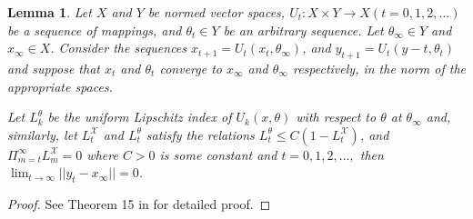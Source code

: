 \documentclass[jair, twoside,11pt,theapa]{article}
\newtheorem{lemm2}{Lemma}
\begin{document}
\begin{lemm2}
Let $X$ and $Y$ be normed vector spaces, $U_t: X \times Y \xrightarrow{} X (t=0,1,2, \ldots)$ be a sequence of mappings, and $\theta_t \in Y$ be an arbitrary sequence. Let $\theta_\infty \in Y$ and $x_\infty \in X$. Consider the sequences $x_{t+1} = U_t(x_t, \theta_\infty)$, and $y_{t+1} = U_t(y-t, \theta_t)$ and suppose that $x_t$ and $\theta_t$ converge to $x_\infty$ and $\theta_\infty$ respectively, in the norm of the appropriate spaces. 

Let $L^\theta_k$ be the uniform Lipschitz index of $U_k(x,\theta)$ with respect to $\theta$ at $\theta_\infty$ and, similarly, let $L^\mathscr{X}_t$ and $L^\theta_t$ satisfy the relations $L^\theta_t \leq C(1 - L^\mathscr{X}_t)$, and $\Pi_{m=t}^\infty L^\mathscr{X}_m = 0$ where $C>0$ is some constant and $t = 0,1,2, \ldots,$ then $\lim_{t \xrightarrow{} \infty} || y_t - x_\infty|| = 0$.
 
\end{lemm2}

\begin{proof}
See Theorem 15 in \citet{szepesvari1999unified} for detailed proof.  
\end{proof}













\end{document}
